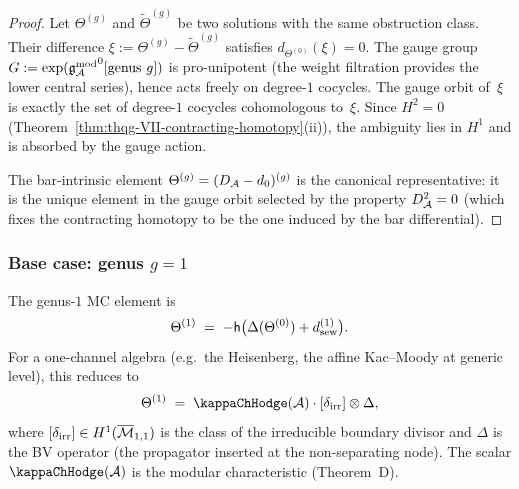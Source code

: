 \begin{proof}
Let $\Theta^{(g)}$ and $\widetilde{\Theta}^{(g)}$ be two
solutions with the same obstruction class. Their difference
$\xi := \Theta^{(g)} - \widetilde{\Theta}^{(g)}$ satisfies
$d_{\Theta^{(0)}}(\xi) = 0$. The gauge group
$G := \exp({\mathfrak{g}_{\mathcal{A}}^{\mathrm{mod}}}^0[\text{genus }g])$ is pro-unipotent
(the weight filtration provides the lower central series), hence
acts freely on degree-$1$ cocycles. The gauge orbit of~$\xi$
is exactly the set of degree-$1$ cocycles cohomologous to~$\xi$.
Since $H^2 = 0$
(Theorem~\ref{thm:thqg-VII-contracting-homotopy}(ii)),
the ambiguity lies in $H^1$ and is absorbed by the gauge action.

The bar-intrinsic element $\Theta^{(g)} = (D_{\mathcal{A}} - d_0)^{(g)}$
is the canonical representative: it is the unique element in
the gauge orbit selected by the property $D_{\mathcal{A}}^2 = 0$ (which
fixes the contracting homotopy to be the one induced by the
bar differential).
\end{proof}

\subsubsection{Base case: genus $g = 1$}

\begin{proposition}
\label{prop:thqg-VII-genus1-solution}
The genus-$1$ MC element is
\begin{equation}%
\Theta^{(1)}
\;=\;
-\hCont\bigl(
\Delta(\Theta^{(0)}) + \dsew^{(1)}
\bigr).
\end{equation}
For a one-channel algebra (e.g.\ the Heisenberg, the affine
Kac--Moody at generic level), this reduces to
\begin{equation}%
\Theta^{(1)}
\;=\;
\kappaChHodge(\cA) \cdot [\delta_{\mathrm{irr}}] \otimes \Delta,
\end{equation}
where $[\delta_{\mathrm{irr}}] \in H^1(\overline{\mathcal{M}}_{1,1})$
is the class of the irreducible boundary divisor and $\Delta$ is
the BV operator (the propagator inserted at the non-separating
node). The scalar $\kappaChHodge(\cA)$ is the modular characteristic
\textup{(}Theorem~D\textup{)}.
\end{proposition}


